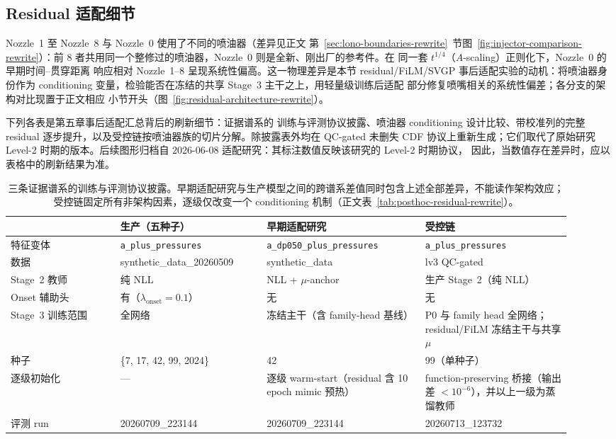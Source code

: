 \FloatBarrier

\subsection{Residual 适配细节}

Nozzle~1 至 Nozzle~8 与 Nozzle~0 使用了不同的喷油器（差异见正文
第~\ref{sec:lono-boundaries-rewrite}~节图~\ref{fig:injector-comparison-rewrite}）：前 8
者共用同一个整修过的喷油器，Nozzle~0 则是全新、刚出厂的参考件。在
同一套 \(t^{1/4}\)（\(A\)-scaling）正则化下，Nozzle~0 的早期时间--贯穿距离
响应相对 Nozzle~1--8 呈现系统性偏高。这一物理差异是本节
residual/FiLM/SVGP 事后适配实验的动机：将喷油器身份作为 conditioning
变量，检验能否在冻结的共享 Stage~3 主干之上，用轻量级训练后适配
部分修复喷嘴相关的系统性偏差；各分支的架构对比现置于正文相应
小节开头（图~\ref{fig:residual-architecture-rewrite}）。

下列各表是第五章事后适配汇总背后的刷新细节：证据谱系的
训练与评测协议披露、喷油器 conditioning 设计比较、带校准列的完整
residual 逐步提升，以及受控链按喷油器族的切片分解。除披露表外均在 QC-gated
未删失 CDF 协议上重新生成；它们取代了原始研究
Level-2 时期的版本。后续图形归档自 2026-06-08
适配研究：其标注数值反映该研究的 Level-2 时期协议，
因此，当数值存在差异时，应以表格中的刷新结果为准。

\begin{table}[tbp]
\centering
\footnotesize
\setlength{\tabcolsep}{4pt}
\begin{tabular}{@{}L{0.18\linewidth}L{0.24\linewidth}L{0.26\linewidth}L{0.24\linewidth}@{}}
\toprule
 & 生产（五种子） & 早期适配研究 & 受控链 \\
\midrule
特征变体 & \texttt{a\_plus\_pressures} & \texttt{a\_dp050\_plus\_pressures} & \texttt{a\_plus\_pressures} \\
数据 & synthetic\_data\_20260509 & synthetic\_data & lv3 QC-gated \\
Stage~2 教师 & 纯 NLL & NLL + \(\mu\)-anchor & 生产 Stage~2（纯 NLL） \\
Onset 辅助头 & 有（\(\lambda_{\mathrm{onset}}=0.1\)） & 无 & 无 \\
Stage~3 训练范围 & 全网络 & 冻结主干（含 family-head 基线） & P0 与 family head 全网络；residual/FiLM 冻结主干与共享 \(\mu\) \\
种子 & \{7, 17, 42, 99, 2024\} & 42 & 99（单种子） \\
逐级初始化 & --- & 逐级 warm-start（residual 含 10 epoch mimic 预热） & function-preserving 桥接（输出差 \(<10^{-6}\)），并以上一级为蒸馏教师 \\
评测 run & 20260709\_223144 & 20260709\_223144 & 20260713\_123732 \\
\bottomrule
\end{tabular}
\caption{三条证据谱系的训练与评测协议披露。早期适配研究与生产模型之间的跨谱系差值同时包含上述全部差异，不能读作架构效应；受控链固定所有非架构因素，逐级仅改变一个 conditioning 机制（正文表~\ref{tab:posthoc-residual-rewrite}）。}
\label{tab:residual-lineage-disclosure}
\end{table}

